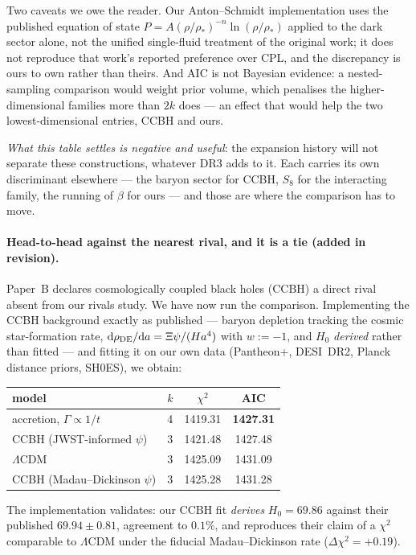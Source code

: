 \documentclass[11pt]{article}
\begin{document}
Two caveats we owe the reader. Our Anton--Schmidt implementation uses the published equation of
state $P = A(\rho/\rho_*)^{-n}\ln(\rho/\rho_*)$ applied to the dark sector alone, not the unified
single-fluid treatment of the original work; it does not reproduce that work's reported preference
over CPL, and the discrepancy is ours to own rather than theirs. And AIC is not Bayesian evidence:
a nested-sampling comparison would weight prior volume, which penalises the higher-dimensional
families more than $2k$ does --- an effect that would help the two lowest-dimensional entries,
CCBH and ours.

\emph{What this table settles is negative and useful}: the expansion history will not separate
these constructions, whatever DR3 adds to it. Each carries its own discriminant elsewhere --- the
baryon sector for CCBH, $S_8$ for the interacting family, the running of $\beta$ for ours --- and
those are where the comparison has to move.

\paragraph{Head-to-head against the nearest rival, and it is a tie (added in revision).}
Paper~B declares cosmologically coupled black holes (CCBH) a direct rival absent from our rivals
study. We have now run the comparison. Implementing the CCBH background exactly as published
\cite{Croker2024} --- baryon depletion tracking the cosmic star-formation rate,
$\mathrm{d}\rho_{\rm DE}/\mathrm{d}a = \Xi\psi/(Ha^4)$ with $w := -1$, and $H_0$ \emph{derived}
rather than fitted --- and fitting it on our own data (Pantheon+, DESI~DR2, Planck distance priors,
SH0ES), we obtain:
\begin{center}
\begin{tabular}{lccc}
\hline
model & $k$ & $\chi^2$ & AIC \\
\hline
accretion, $\Gamma \propto 1/t$ & 4 & 1419.31 & \textbf{1427.31} \\
CCBH (JWST-informed $\psi$) & 3 & 1421.48 & 1427.48 \\
$\Lambda$CDM & 3 & 1425.09 & 1431.09 \\
CCBH (Madau--Dickinson $\psi$) & 3 & 1425.28 & 1431.28 \\
\hline
\end{tabular}
\end{center}
The implementation validates: our CCBH fit \emph{derives} $H_0 = 69.86$ against their published
$69.94 \pm 0.81$, agreement to $0.1\%$, and reproduces their claim of a $\chi^2$ comparable to
$\Lambda$CDM under the fiducial Madau--Dickinson rate ($\Delta\chi^2 = +0.19$).
\end{document}
